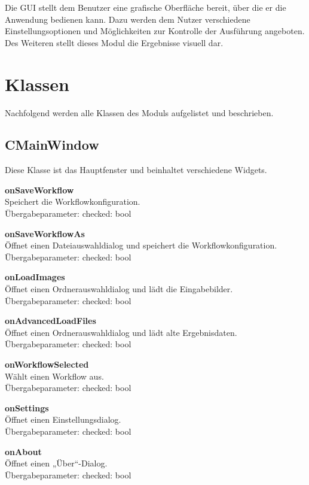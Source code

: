Die GUI stellt dem Benutzer eine grafische Oberfläche bereit, über die er die Anwendung bedienen kann. Dazu werden dem Nutzer verschiedene Einstellungsoptionen und Möglichkeiten zur Kontrolle der Ausführung angeboten. Des Weiteren stellt dieses Modul die Ergebnisse visuell dar.
\section{Klassen}
Nachfolgend werden alle Klassen des Moduls aufgelistet und beschrieben.
\subsection{CMainWindow}
Diese Klasse ist das Hauptfenster und beinhaltet verschiedene Widgets.
\beginSlots
\item \textbf{onSaveWorkflow} \\Speichert die Workflowkonfiguration. \\Übergabeparameter: checked: bool
\item \textbf{onSaveWorkflowAs} \\Öffnet einen Dateiauswahldialog und speichert die Workflowkonfiguration. \\Übergabeparameter: checked: bool
\item \textbf{onLoadImages} \\Öffnet einen Ordnerauswahldialog und lädt die Eingabebilder. \\Übergabeparameter: checked: bool
\item \textbf{onAdvancedLoadFiles} \\Öffnet einen Ordnerauswahldialog und lädt alte Ergebnisdaten. \\Übergabeparameter: checked: bool
\item \textbf{onWorkflowSelected} \\Wählt einen Workflow aus. \\Übergabeparameter: checked: bool
\item \textbf{onSettings} \\Öffnet einen Einstellungsdialog. \\Übergabeparameter: checked: bool
\item \textbf{onAbout} \\Öffnet einen „Über“-Dialog. \\Übergabeparameter: checked: bool
\closeMembers

